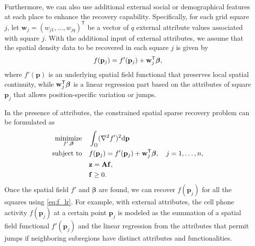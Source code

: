 Furthermore, we can also use additional external social or demographical features at each place to enhance the recovery capability.
Specifically, for each grid square $j$, let $\mathbf w_j = (w_{j1},\ldots,w_{jq})^\mathsf{T}$ be a vector of $q$ external attribute values associated with square $j$. With the additional input of external attributes, we assume that the spatial density data to be recovered in each square $j$ is given by 
\begin{equation}\label{eq:f_lr}
	f(\mathbf p_j) = f'(\mathbf p_j) + \mathbf w_j^{\sf T}\boldsymbol{\beta},
\end{equation}
where $f'(\mathbf p)$ is an underlying spatial field functional that preserves local spatial continuity, while $\mathbf w_j^{\sf T}\boldsymbol{\beta}$ is a linear regression part based on the attributes of square $\mathbf p_j$ that allows position-specific variation or jumps.

In the presence of attributes, the constrained spatial sparse recovery problem can be formulated as
\begin{equation}
\label{eq:prob1}
\begin{split}
	\underset{f', \boldsymbol{\beta}}{\mbox{minimize}}\quad 		& \int_\Omega(\nabla^2 f')^2\mathrm{d}\mathbf p \\
	\mbox{subject to}
				  \quad & f(\mathbf p_j) = f'(\mathbf p_j) + \mathbf w_j^{\sf T}\boldsymbol{\beta},\quad j = 1,\ldots,n,\\
						& \mathbf z = \mathbf A \mathbf f,\\
						&\mathbf f\ge 0.
\end{split}
\end{equation}
Once the spatial field $f'$ and $\boldsymbol{\beta}$ are found, we can recover $f(\mathbf p_j)$ for all the squares using \eqref{eq:f_lr}. For example, with external attributes, the cell phone activity $f(\mathbf p_j)$ at a certain point $\mathbf p_j$ is modeled as the summation of a spatial field functional $f'(\mathbf p_j)$ and the linear regression from the attributes that permit jumps if neighboring subregions have distinct attributes and functionalities.












